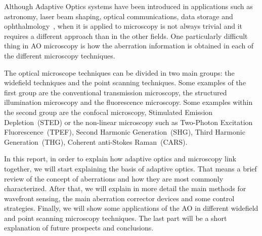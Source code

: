 Although Adaptive Optics systems have been introduced in applications such as astronomy, laser beam shaping, optical communications, data storage and ophthalmology~\cite{AOM_biomedical}, when it is applied to microscopy is not always trivial and it requires a different approach than in the other fields. One particularly difficult thing in AO microscopy is how the aberration information is obtained in each of the different microscopy techniques.

The optical microscope techniques can be divided in two main groups: the widefield techniques and the point scanning techniques. Some examples of the first group are the conventional transmission microscopy, the structured illumination microscopy and the fluorescence microscopy. Some examples within the second group are the confocal microscopy, Stimulated Emission Depletion~(STED) or the non-linear microscopy such as Two-Photon Excitation Fluorescence~(TPEF), Second Harmonic Generation~(SHG), Third Harmonic Generation~(THG), Coherent anti-Stokes Raman~(CARS).  

In this report, in order to explain how adaptive optics and microscopy link together, we will start explaining the basis of adaptive optics. That means a brief review of the concept of aberrations and how they are most commonly characterized. After that, we will explain in more detail the main methods for wavefront sensing, the main aberration corrector devices and some control strategies. Finally, we will show some applications of the AO in different widefield and point scanning microscopy techniques. The last part will be a short explanation of future prospects and conclusions.       
